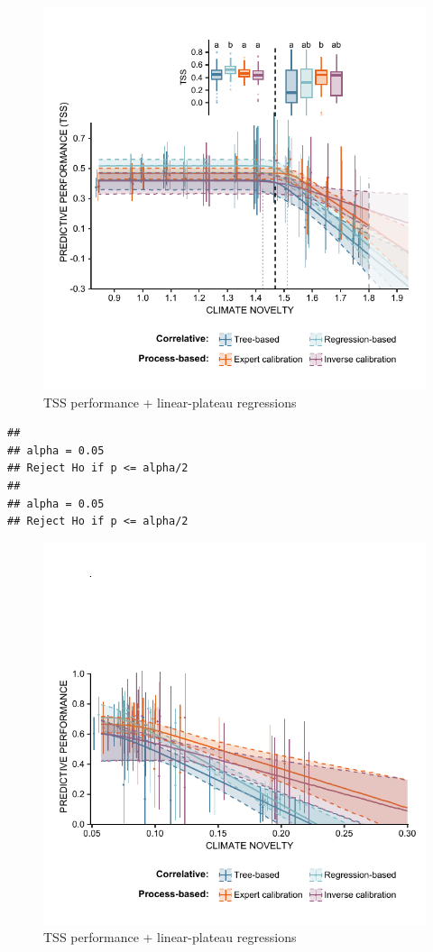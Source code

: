 \documentclass[11pt,]{article}
\begin{document}
\begin{figure}
\centering
\includegraphics{paper_files/figure-latex/figure_tss_type2-1.pdf}
\caption{TSS performance + linear-plateau regressions}
\end{figure}

\begin{verbatim}
## 
## alpha = 0.05
## Reject Ho if p <= alpha/2
## 
## alpha = 0.05
## Reject Ho if p <= alpha/2
\end{verbatim}

\begin{figure}
\centering
\includegraphics{paper_files/figure-latex/figure_sorensen_type2-1.pdf}
\caption{TSS performance + linear-plateau regressions}
\end{figure}
\end{document}
